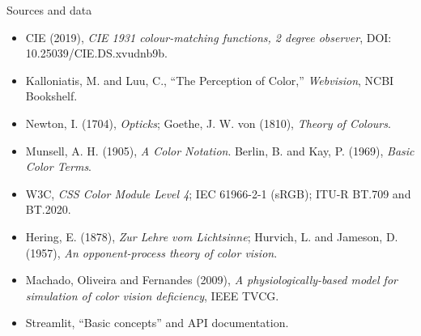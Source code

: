 \documentclass[aspectratio=169,11pt]{beamer}
\begin{document}
\begin{frame}{Sources and data}
  \scriptsize
  \begin{itemize}
    \item CIE (2019), \emph{CIE 1931 colour-matching functions, 2 degree observer}, DOI: 10.25039/CIE.DS.xvudnb9b.
    \item Kalloniatis, M. and Luu, C., ``The Perception of Color,'' \emph{Webvision}, NCBI Bookshelf.
    \item Newton, I. (1704), \emph{Opticks}; Goethe, J. W. von (1810), \emph{Theory of Colours}.
    \item Munsell, A. H. (1905), \emph{A Color Notation}. \quad Berlin, B. and Kay, P. (1969), \emph{Basic Color Terms}.
    \item W3C, \emph{CSS Color Module Level 4}; IEC 61966-2-1 (sRGB); ITU-R BT.709 and BT.2020.
    \item Hering, E. (1878), \emph{Zur Lehre vom Lichtsinne}; Hurvich, L. and Jameson, D. (1957), \emph{An opponent-process theory of color vision}.
    \item Machado, Oliveira and Fernandes (2009), \emph{A physiologically-based model for simulation of color vision deficiency}, IEEE TVCG.
    \item Streamlit, ``Basic concepts'' and API documentation.
  \end{itemize}
\end{frame}
\end{document}
